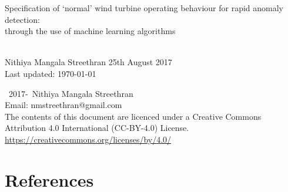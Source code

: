 \documentclass[twoside,12pt,openany]{book}
\def\theauthor{Nithiya Mangala Streethran}
\def\thetitle{%
  Specification of \texorpdfstring{`}{'}normal' wind turbine operating
  behaviour for rapid anomaly detection:\texorpdfstring{\\}{}
  through the use of machine learning algorithms%
}
\begin{document}

\frontmatter

\begin{titlepage}
  \hspace{0pt}\vfill %
  \centering %
  \Large\thetitle
  \\[4cm]
  \large\theauthor
  \vfill
  25th August 2017
  \\[.5cm]
  Last updated: \today
  \vfill\hspace{0pt} %
\end{titlepage}

{\setlength{\parindent}{0pt}
\hspace{0pt}\vfill
\textcopyright~2017-\the\year{}~\theauthor
\\[.5cm]
Email: nmstreethran@gmail.com
\\[.5cm]
The contents of this document are licenced under a
Creative Commons Attribution 4.0 International (CC-BY-4.0) License. \\
\url{https://creativecommons.org/licenses/by/4.0/}
\vfill\hspace{0pt}
}

\onehalfspacing


\contentlists

\themainmatter







{%
  \backmatter%
  \chapter{References}%
  \printbibliography[heading=none]%
}

\theappendix


\end{document}
